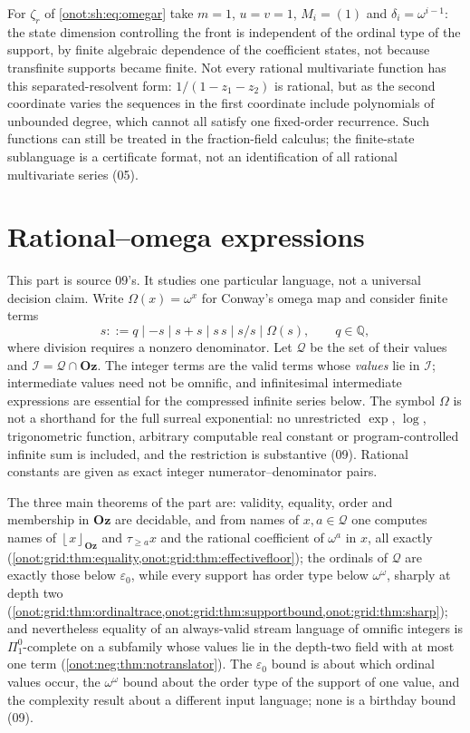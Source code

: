 \documentclass[11pt,oneside]{article}
\numberwithin{equation}{section}
\theoremstyle{definition}
\theoremstyle{remark}
\newcommand{\Oz}{\mathbf{Oz}}
\newcommand{\Q}{\mathbb Q}
\newcommand{\QO}{\mathcal Q}
\newcommand{\IO}{\mathcal I}
\newcommand{\Om}{\Omega}
\newcommand{\tr}[1]{\tau_{\ge #1}}
\newcommand{\fl}[1]{\left\lfloor #1\right\rfloor_{\Oz}}
\begin{document}
For $\zeta_r$ of \eqref{onot:sh:eq:omegar} take $m=1$, $u=v=1$, $M_i=(1)$ and
$\delta_i=\omega^{i-1}$: the state dimension controlling the front is independent
of the ordinal type of the support, by finite algebraic dependence of the
coefficient states, not because transfinite supports became finite. Not every
rational multivariate function has this separated-resolvent form:
$1/(1-z_1-z_2)$ is rational, but as the second coordinate varies the sequences in
the first coordinate include polynomials of unbounded degree, which cannot all
satisfy one fixed-order recurrence. Such functions can still be treated in the
fraction-field calculus; the finite-state sublanguage is a certificate format,
not an identification of all rational multivariate series (05).

\part{Rational--omega expressions}\label{onot:grid:part}

This part is source 09's. It studies one particular language, not a universal
decision claim. Write $\Om(x)=\omega^x$ for Conway's omega map and consider
finite terms
\begin{equation}\label{onot:grid:eq:grammar}
 s::=q\mid -s\mid s+s\mid s\,s\mid s/s\mid\Om(s),\qquad q\in\Q,
\end{equation}
where division requires a nonzero denominator. Let $\QO$ be the set of their
values and $\IO=\QO\cap\Oz$. The integer terms are the valid terms whose
\emph{values} lie in $\IO$; intermediate values need not be omnific, and
infinitesimal intermediate expressions are essential for the compressed infinite
series below. The symbol $\Om$ is not a shorthand for the full surreal
exponential: no unrestricted $\exp$, $\log$, trigonometric function, arbitrary
computable real constant or program-controlled infinite sum is included, and the
restriction is substantive (09). Rational constants are given as exact integer
numerator--denominator pairs.

The three main theorems of the part are: validity, equality, order and
membership in $\Oz$ are decidable, and from names of $x,a\in\QO$ one computes
names of $\fl x$ and $\tr a x$ and the rational coefficient of $\omega^a$ in $x$,
all exactly (\cref{onot:grid:thm:equality,onot:grid:thm:effectivefloor}); the
ordinals of $\QO$ are exactly those below $\varepsilon_0$, while every support has
order type below $\omega^\omega$, sharply at depth two
(\cref{onot:grid:thm:ordinaltrace,onot:grid:thm:supportbound,onot:grid:thm:sharp});
and nevertheless equality of an always-valid stream language of omnific integers
is $\Pi^0_1$-complete on a subfamily whose values lie in the depth-two field with
at most one term (\cref{onot:neg:thm:notranslator}). The $\varepsilon_0$ bound is
about which ordinal values occur, the $\omega^\omega$ bound about the order type
of the support of one value, and the complexity result about a different input
language; none is a birthday bound (09).
\end{document}
